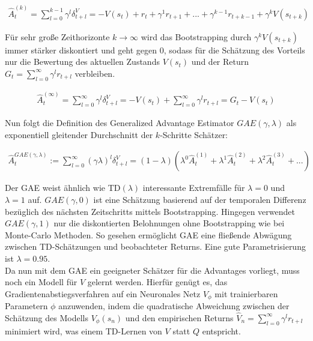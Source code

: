 \begin{equation}
\begin{aligned}
\hat{A}_t^{(k)} = \sum_{l = 0}^{k - 1} \gamma^l \delta_{t+l}^V
= - V(s_t) + r_t + \gamma^1 r_{t+1} + ... + \gamma^{k-1} r_{t+k-1} + \gamma^k V(s_{t+k})
\end{aligned}
\end{equation}

Für sehr große Zeithorizonte $k \xrightarrow{} \infty$ wird das Bootstrapping durch
$\gamma^k V(s_{t+k})$ immer stärker diskontiert und geht gegen 0, sodass für die
Schätzung des Vorteils nur die Bewertung des aktuellen Zustands $V(s_t)$ und
der Return $G_t = \sum_{l=0}^\infty \gamma^l r_{t+l}$ verbleiben.

\begin{equation}
\begin{aligned}
\hat{A}_t^{(\infty)} = \sum_{l = 0}^{\infty} \gamma^l \delta_{t+l}^V
    = -V(s_t) + \sum_{l = 0}^{\infty} \gamma^l r_{t+l} = G_t - V(s_t)
\end{aligned}
\end{equation}

Nun folgt die Definition des Generalized Advantage Estimator $GAE(\gamma, \lambda)$
\cite{schulman2018gae} als exponentiell gleitender Durchschnitt der $k$-Schritte Schätzer:

\begin{equation}
\begin{aligned}
\hat{A}_t^{GAE(\gamma, \lambda)} := \sum_{l = 0}^\infty (\gamma \lambda)^l \delta_{t+l}^V
    = (1 - \lambda) (\lambda^0 \hat{A}_t^{(1)} + \lambda^1 \hat{A}_t^{(2)}
        + \lambda^2 \hat{A}_t^{(3)} + ...)
\end{aligned}
\end{equation}

Der GAE weist ähnlich wie TD$(\lambda)$ interessante Extremfälle für $\lambda = 0$
und $\lambda = 1$ auf. $GAE(\gamma, 0)$ ist eine Schätzung basierend auf der temporalen
Differenz bezüglich des nächsten Zeitschritts mittels Bootstrapping. Hingegen verwendet
$GAE(\gamma, 1)$ nur die diskontierten Belohnungen ohne Bootstrapping wie bei Monte-Carlo
Methoden. So gesehen ermöglicht GAE eine fließende Abwägung zwischen TD-Schätzungen und
beobachteter Returns. Eine gute Parametrisierung ist $\lambda = 0.95$.\\

Da nun mit dem GAE ein geeigneter Schätzer für die Advantages vorliegt, muss noch ein
Modell für $V$ gelernt werden. Hierfür genügt es, das Gradientenabstiegsverfahren auf
ein Neuronales Netz $V_\phi$ mit trainierbaren Parametern $\phi$ anzuwenden, indem
die quadratische Abweichung zwischen der Schätzung des Modells $V_\phi(s_n)$ und den
empirischen Returns $\hat{V}_n = \sum_{l=0}^\infty \gamma^l r_{t+l}$ minimiert wird,
was einem TD-Lernen von $V$ statt $Q$ entspricht.

